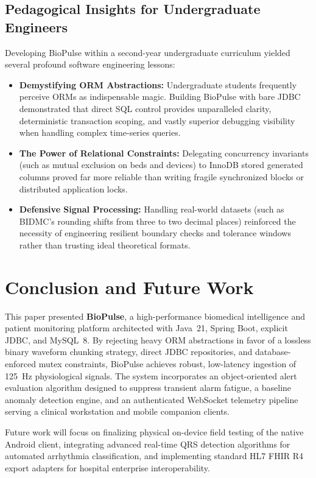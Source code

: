 \documentclass[10pt,journal,compsoc]{IEEEtran}
\begin{document}
\subsection{Pedagogical Insights for Undergraduate Engineers}
Developing BioPulse within a second-year undergraduate curriculum yielded several profound software engineering lessons:
\begin{itemize}
    \item \textbf{Demystifying ORM Abstractions:} Undergraduate students frequently perceive ORMs as indispensable magic. Building BioPulse with bare JDBC demonstrated that direct SQL control provides unparalleled clarity, deterministic transaction scoping, and vastly superior debugging visibility when handling complex time-series queries.
    \item \textbf{The Power of Relational Constraints:} Delegating concurrency invariants (such as mutual exclusion on beds and devices) to InnoDB stored generated columns proved far more reliable than writing fragile synchronized blocks or distributed application locks.
    \item \textbf{Defensive Signal Processing:} Handling real-world datasets (such as BIDMC's rounding shifts from three to two decimal places) reinforced the necessity of engineering resilient boundary checks and tolerance windows rather than trusting ideal theoretical formats.
\end{itemize}

\section{Conclusion and Future Work}
\label{sec:conclusion}

This paper presented \textbf{BioPulse}, a high-performance biomedical intelligence and patient monitoring platform architected with Java~21, Spring Boot, explicit JDBC, and MySQL~8. By rejecting heavy ORM abstractions in favor of a lossless binary waveform chunking strategy, direct JDBC repositories, and database-enforced mutex constraints, BioPulse achieves robust, low-latency ingestion of 125~Hz physiological signals. The system incorporates an object-oriented alert evaluation algorithm designed to suppress transient alarm fatigue, a baseline anomaly detection engine, and an authenticated WebSocket telemetry pipeline serving a clinical workstation and mobile companion clients.

Future work will focus on finalizing physical on-device field testing of the native Android client, integrating advanced real-time QRS detection algorithms for automated arrhythmia classification, and implementing standard HL7 FHIR R4 export adapters for hospital enterprise interoperability.



\end{document}
